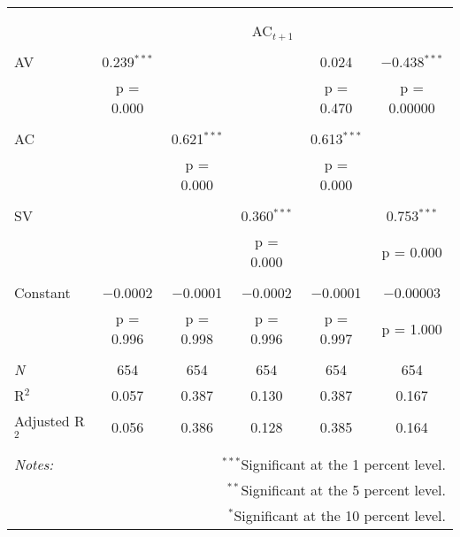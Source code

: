 
\begin{tabular}{@{\extracolsep{5pt}}lccccc} 
\\[-1.8ex]\hline 
\hline \\[-1.8ex] 
\\[-1.8ex] & \multicolumn{5}{c}{AC$_{t+1}$} \\ 
\hline \\[-1.8ex] 
 AV & 0.239$^{***}$ &  &  & 0.024 & $-$0.438$^{***}$ \\ 
  & p = 0.000 &  &  & p = 0.470 & p = 0.00000 \\ 
  & & & & & \\ 
 AC &  & 0.621$^{***}$ &  & 0.613$^{***}$ &  \\ 
  &  & p = 0.000 &  & p = 0.000 &  \\ 
  & & & & & \\ 
 SV &  &  & 0.360$^{***}$ &  & 0.753$^{***}$ \\ 
  &  &  & p = 0.000 &  & p = 0.000 \\ 
  & & & & & \\ 
 Constant & $-$0.0002 & $-$0.0001 & $-$0.0002 & $-$0.0001 & $-$0.00003 \\ 
  & p = 0.996 & p = 0.998 & p = 0.996 & p = 0.997 & p = 1.000 \\ 
  & & & & & \\ 
\textit{N} & 654 & 654 & 654 & 654 & 654 \\ 
R$^{2}$ & 0.057 & 0.387 & 0.130 & 0.387 & 0.167 \\ 
Adjusted R$^{2}$ & 0.056 & 0.386 & 0.128 & 0.385 & 0.164 \\ 
\hline 
\hline \\[-1.8ex] 
\textit{Notes:} & \multicolumn{5}{r}{$^{***}$Significant at the 1 percent level.} \\ 
 & \multicolumn{5}{r}{$^{**}$Significant at the 5 percent level.} \\ 
 & \multicolumn{5}{r}{$^{*}$Significant at the 10 percent level.} \\ 
\end{tabular} 
